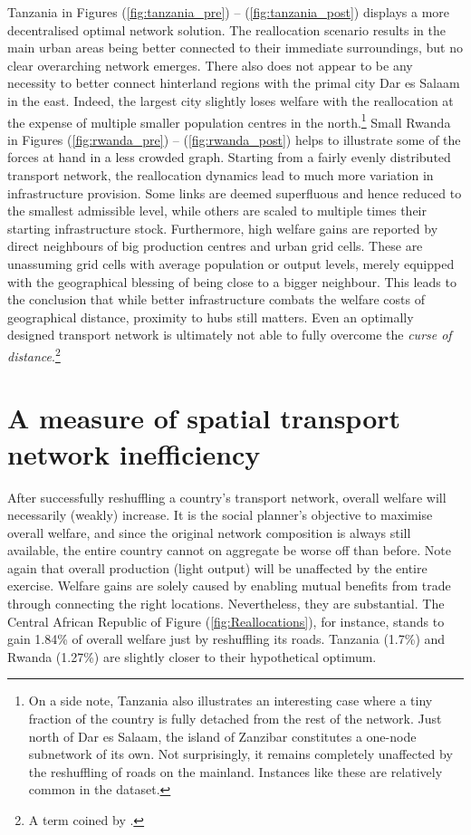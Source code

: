 \documentclass[11pt, oneside]{article}   	%
\let\oldref\ref
\renewcommand{\ref}[1]{(\oldref{#1})}
\begin{document}
Tanzania in Figures \ref{fig:tanzania_pre} -- \ref{fig:tanzania_post} displays a more decentralised optimal network solution. The reallocation scenario results in the main urban areas being better connected to their immediate surroundings, but no clear overarching network emerges. There also does not appear to be any necessity to better connect hinterland regions with the primal city Dar es Salaam in the east. Indeed, the largest city slightly loses welfare with the reallocation at the expense of multiple smaller population centres in the north.\footnote{On a side note, Tanzania also illustrates an interesting case where a tiny fraction of the country is fully detached from the rest of the network. Just north of Dar es Salaam, the island of Zanzibar constitutes a one-node subnetwork of its own. Not surprisingly, it remains completely unaffected by the reshuffling of roads on the mainland. Instances like these are relatively common in the dataset.} Small Rwanda in Figures \ref{fig:rwanda_pre} -- \ref{fig:rwanda_post} helps to illustrate some of the forces at hand in a less crowded graph. Starting from a fairly evenly distributed transport network, the reallocation dynamics lead to much more variation in infrastructure provision. Some links are deemed superfluous and hence reduced to the smallest admissible level, while others are scaled to multiple times their starting infrastructure stock. Furthermore, high welfare gains are reported by direct neighbours of big production centres and urban grid cells. These are unassuming grid cells with average population or output levels, merely equipped with the geographical blessing of being close to a bigger neighbour. This leads to the conclusion that while better infrastructure combats the welfare costs of geographical distance, proximity to hubs still matters. Even an optimally designed transport network is ultimately not able to fully overcome the \emph{curse of distance}.\footnote{A term coined by \cite{Boulhol_Havedevelopedcountries_2010}.}

\section{A measure of spatial transport network inefficiency}
\label{chapter:optimization}
After successfully reshuffling a country's transport network, overall welfare will necessarily (weakly) increase. It is the social planner's objective to maximise overall welfare, and since the original network composition is always still available, the entire country cannot on aggregate be worse off than before. Note again that overall production (light output) will be unaffected by the entire exercise. Welfare gains are solely caused by enabling mutual benefits from trade through connecting the right locations. Nevertheless, they are substantial. The Central African Republic of Figure \ref{fig:Reallocations}, for instance, stands to gain 1.84\% of overall welfare just by reshuffling its roads. Tanzania (1.7\%) and Rwanda (1.27\%) are slightly closer to their hypothetical optimum.
\end{document}
